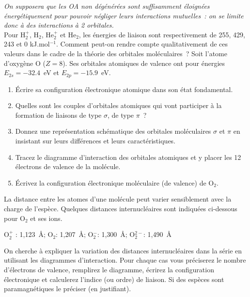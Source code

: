 \textit{On supposera que les OA non d\'eg\'en\'er\'ees sont suffisamment \'eloign\'ees \'energ\'etiquement pour pouvoir n\'egliger leurs interactions mutuelles~: on se limite donc \`a des interactions \`a 2 orbitales.}\\
Pour H$_2^+$, H$_2$, He$_2^+$ et He$_2$, les \'energies de liaison sont respectivement de 255, 429, 243 et 0 kJ.mol$^{-1}$. 
Comment peut-on rendre compte qualitativement de ces valeurs dans le cadre de la th\'eorie des orbitales mol\'eculaires~?
Soit l'atome d'oxyg\`ene O ($Z=8$). Ses orbitales atomiques de valence ont pour \'energies $E_{2s}=-32.4$~eV et $E_{2p}=-15.9$~eV.
\begin{enumerate}[\bf 1)]
\item \'Ecrire sa configuration \'electronique atomique dans son \'etat fondamental.
\item Quelles sont les couples d'orbitales atomiques qui vont participer \`a la formation de liaisons de type $\sigma$, de type $\pi$~?
\item Donnez une repr\'esentation sch\'ematique des orbitales mol\'eculaires $\sigma$ et $\pi$ en insistant sur leurs diff\'erences et leurs caract\'eristiques. 
\item Tracez le diagramme d'interaction des orbitales atomiques et y placer les 12 \'electrons de valence de la mol\'ecule. 
\item \'Ecrivez la configuration \'electronique mol\'eculaire (de valence) de O$_2$. 
\end{enumerate}
\clearpage
La distance entre les atomes d'une mol\'ecule peut varier sensiblement avec la charge de l'esp\`ece.
Quelques distances internucl\'eaires sont indiqu\'ees ci-dessous pour O$_2$ et ses ions.
\begin{tabbing}
\hspace{1cm}O$_2^+$ : 1,123~\AA ; O$_2$: 1,207~\AA ; O$_2^-$: 1,300~\AA ; O$_2^{2-}$: 1,490~\AA
\end{tabbing}
On cherche \`a  expliquer la variation des distances internucl\'eaires dans la s\'erie 
en utilisant les diagrammes d'interaction. %
Pour chaque cas vous pr\'eciserez le nombre d'\'electrons de valence, remplirez le diagramme, 
\'ecrirez  la configuration \'electronique et calculerez l'indice (ou ordre) de
liaison. Si des esp\`eces sont paramagn\'etiques le pr\'eciser (en justifiant).\\

